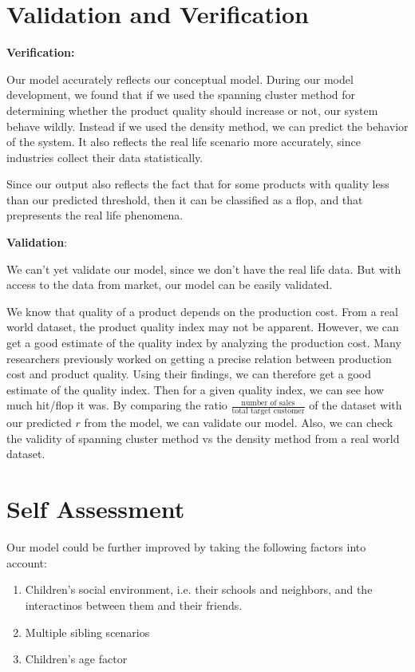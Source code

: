 \documentclass[article, 11pt, a4paper, onesize]{memoir}
\begin{document}
\section{Validation and Verification}

\textbf{Verification:}

Our model accurately reflects our conceptual model. During our model development, we found
that if we used the spanning cluster method for determining whether the product quality
should increase or not, our system behave wildly. Instead if we used the density method,
we can predict the behavior of the system. It also reflects the real life scenario more
accurately, since industries collect their data statistically. 

Since our output also reflects the fact that for some products with quality less than our
predicted threshold, then it can be classified as a flop, and that prepresents the real
life phenomena.

\textbf{Validation}:

We can't yet validate our model, since we don't have the real life data. But with access
to the data from market, our model can be easily validated.

We know that quality of a product depends on the production 
cost. From a real world dataset, the product quality index 
may not be apparent. However, we can get a good estimate of 
the quality index by analyzing the production cost. Many 
researchers previously worked on getting a precise relation 
between production cost and product quality. Using their 
findings, we can therefore get a good estimate of the quality 
index. Then for a given quality index, we can see how much hit/flop it was. 
By comparing the ratio $\frac{\text{number of sales}}{\text{total target customer}}$ 
of the dataset with our predicted $r$ from the model, we can 
validate our model. Also, we can check the validity of 
spanning cluster method vs the density method from a real world dataset. 

\section{Self Assessment}

Our model could be further improved by taking the following factors into account:

\begin{enumerate}
    \item Children's social environment, i.e. their schools and neighbors, and the
        interactinos between them and their friends.
    \item Multiple sibling scenarios
    \item Children's age factor
\end{enumerate}
\end{document}
